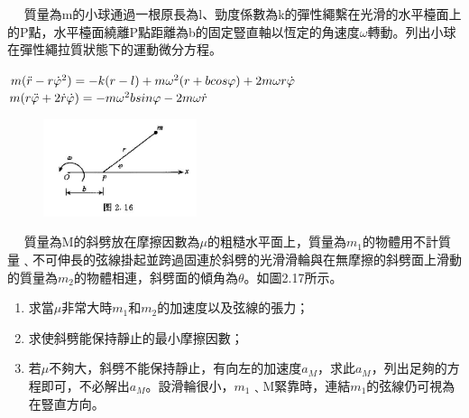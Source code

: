 \documentclass[cn,10pt,math=newtx,chinesefont=founder]{../elegantbook}
\begin{document}
\newpage


\begin{example}　
    質量為m的小球通過一根原長為l、勁度係數為k的彈性繩繫在光滑的水平檯面上的P點，水平檯面繞離P點距離為b的固定豎直軸以恆定的角速度$\omega$轉動。列出小球在彈性繩拉質狀態下的運動微分方程。
    
    \rightline{[2.1.23]}

\end{example}

\begin{solution}
$m(\Ddot{r} - r{\Dot{\varphi}}^2) = -k(r-l) + m\omega^2(r+bcos\varphi) + 2m\omega r\Dot{\varphi}$\\
$m(r\Ddot{\varphi} + 2\Dot{r}\Dot{\varphi}) = -m\omega^2bsin\varphi - 2m\omega \Dot{r}$
\end{solution}

\begin{figure}[htbp]
\flushright
\includegraphics[width=0.4\textwidth]{image/2.16.JPG}
\end{figure}

\newpage


\begin{example}　
    質量為M的斜劈放在摩擦因數為$\mu$的粗糙水平面上，質量為$m_1$的物體用不計質量﹑不可伸長的弦線掛起並跨過固連於斜劈的光滑滑輪與在無摩擦的斜劈面上滑動的質量為$m_2$的物體相連，斜劈面的傾角為$\theta$。如圖2.17所示。
    \begin{enumerate}[label=(\arabic*)]
    \item 求當$\mu$非常大時$m_1$和$m_2$的加速度以及弦線的張力；
    \item 求使斜劈能保持靜止的最小摩擦因數；
    \item 若$\mu$不夠大，斜劈不能保持靜止，有向左的加速度$a_M$，求此$a_M$，列出足夠的方程即可，不必解出$a_M$。設滑輪很小，$m_1$﹑M緊靠時，連結$m_1$的弦線仍可視為在豎直方向。
    \end{enumerate}
    
    \rightline{[2.1.24]}
    
\end{example}
\end{document}
